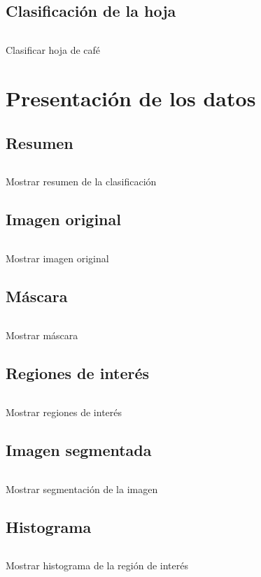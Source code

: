 \subsection{Clasificación de la hoja}
\begin{listing}[!ht]
\inputminted{python}{code_listings/categorize.py}
\caption{Clasificar hoja de café}
\label{code:categorize}
\end{listing}

\section{Presentación de los datos}

\subsection{Resumen}
\begin{listing}[!ht]
\inputminted{python}{code_listings/show_summary.py}
\caption{Mostrar resumen de la clasificación}
\label{code:show_summary}
\end{listing}

\subsection{Imagen original}
\begin{listing}[!ht]
\inputminted{python}{code_listings/show_original_image.py}
\caption{Mostrar imagen original}
\label{code:show_original_image}
\end{listing}

\subsection{Máscara}
\begin{listing}[!ht]
\inputminted{python}{code_listings/show_mask.py}
\caption{Mostrar máscara}
\label{code:show_mask}
\end{listing}

\subsection{Regiones de interés}
\begin{listing}[!ht]
\inputminted{python}{code_listings/show_roi.py}
\caption{Mostrar regiones de interés}
\label{code:show_roi}
\end{listing}

\subsection{Imagen segmentada}
\begin{listing}[!ht]
\inputminted{python}{code_listings/show_segmentation.py}
\caption{Mostrar segmentación de la imagen}
\label{code:show_segmentation}
\end{listing}

\subsection{Histograma}
\begin{listing}[!ht]
\inputminted{python}{code_listings/show_histogram.py}
\caption{Mostrar histograma de la región de interés}
\label{code:show_histogram}
\end{listing}